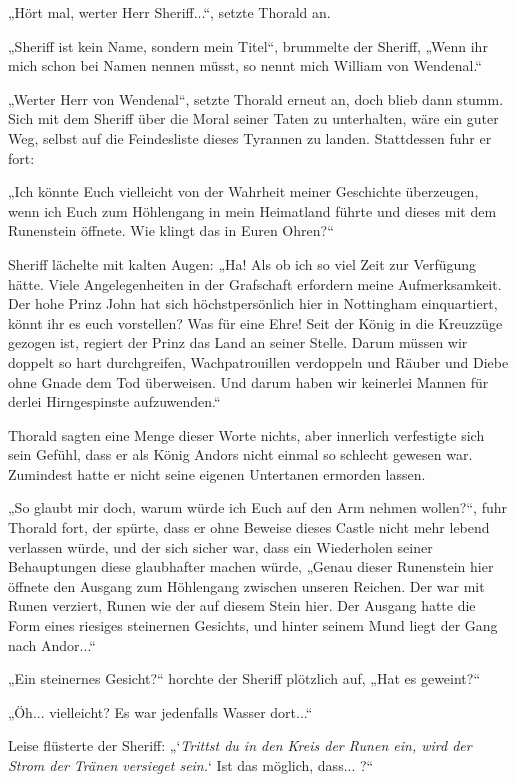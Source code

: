 „Hört mal, werter Herr Sheriff...“, setzte Thorald an.

„Sheriff ist kein Name, sondern mein Titel“, brummelte der Sheriff, „Wenn ihr mich schon bei Namen nennen müsst, so nennt mich William von Wendenal.“

„Werter Herr von Wendenal“, setzte Thorald erneut an, doch blieb dann stumm. Sich mit dem Sheriff über die Moral seiner Taten zu unterhalten, wäre ein guter Weg, selbst auf die Feindesliste dieses Tyrannen zu landen. Stattdessen fuhr er fort:

„Ich könnte Euch vielleicht von der Wahrheit meiner Geschichte überzeugen, wenn ich Euch zum Höhlengang in mein Heimatland führte und dieses mit dem Runenstein öffnete. Wie klingt das in Euren Ohren?“

Sheriff lächelte mit kalten Augen: „Ha! Als ob ich so viel Zeit zur Verfügung hätte. Viele Angelegenheiten in der Grafschaft erfordern meine Aufmerksamkeit. Der hohe Prinz John hat sich höchstpersönlich hier in Nottingham einquartiert, könnt ihr es euch vorstellen? Was für eine Ehre! Seit der König in die Kreuzzüge gezogen ist, regiert der Prinz das Land an seiner Stelle. Darum müssen wir doppelt so hart durchgreifen, Wachpatrouillen verdoppeln und Räuber und Diebe ohne Gnade dem Tod überweisen. Und darum haben wir keinerlei Mannen für derlei Hirngespinste aufzuwenden.“

Thorald sagten eine Menge dieser Worte nichts, aber innerlich verfestigte sich sein Gefühl, dass er als König Andors nicht einmal so schlecht gewesen war. Zumindest hatte er nicht seine eigenen Untertanen ermorden lassen.

„So glaubt mir doch, warum würde ich Euch auf den Arm nehmen wollen?“, fuhr Thorald fort, der spürte, dass er ohne Beweise dieses Castle nicht mehr lebend verlassen würde, und der sich sicher war, dass ein Wiederholen seiner Behauptungen diese glaubhafter machen würde, „Genau dieser Runenstein hier öffnete den Ausgang zum Höhlengang zwischen unseren Reichen. Der war mit Runen verziert, Runen wie der auf diesem Stein hier. Der Ausgang hatte die Form eines riesiges steinernen Gesichts, und hinter seinem Mund liegt der Gang nach Andor...“

„Ein steinernes Gesicht?“ horchte der Sheriff plötzlich auf, „Hat es geweint?“

„Öh... vielleicht? Es war jedenfalls Wasser dort...“

Leise flüsterte der Sheriff: „‘\textit{Trittst du in den Kreis der Runen ein, wird der Strom der Tränen versieget sein.}‘ Ist das möglich, dass... ?“

